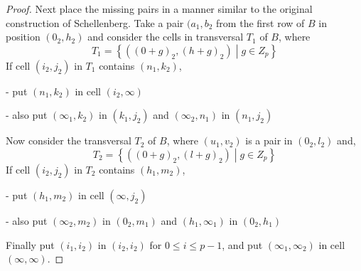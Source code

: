 \documentclass[
  11pt,
  a4paper]{book}
\begin{document}
\begin{proof}
Next place the missing pairs in a manner similar to the
original construction of Schellenberg. Take a pair
$(a_1,b_2$ from the first row of $B$ in position $(0_2,h_2)$
and consider the cells in transversal $T_1$ of $B$, where
$$T_1 = \left \{((0 + g)_2,(h + g)_2) \middle| g \in Z_p \right \}$$
If cell $(i_2, j_2)$ in $T_1$ contains $(n_1, k_2)$,

  - put $(n_1, k_2)$ in cell $(i_2, \infty)$

  - also put $(\infty _1, k_2)$ in $(k_1, j_2)$ and
    $(\infty _2, n_1)$ in $(n_1, j_2)$

Now consider the transversal $T_2$ of $B$, where $(u_1, v_2)$
is a pair in $(0_2, l_2)$ and,
$$T_2 = \left \{((0 + g)_2, (l + g)_2) \middle| g \in Z_p \right \}$$
If cell $(i_2, j_2)$ in $T_2$ contains $(h_1, m_2)$,

  - put $(h_1, m_2)$ in cell $(\infty, j_2)$

  - also put $(\infty _2, m_2)$ in $(0_2, m_1)$ and
    $(h_1, \infty _1)$ in $(0_2,h_1)$

Finally put $(i_1, i_2)$ in $(i_2, i_2)$ for
$0 \leq i \leq p - 1$, and put $(\infty _1, \infty _2)$ in
cell $(\infty, \infty)$.
\end{proof}
\end{document}
